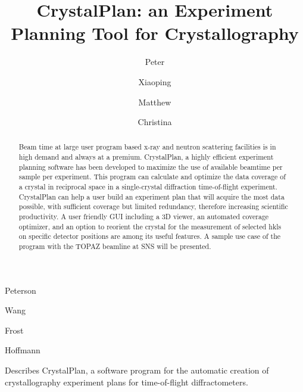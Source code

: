 \documentclass[final]{iucr}              %
\begin{document}


\title{CrystalPlan: an Experiment Planning Tool for Crystallography}



\author[]{Peter}{Peterson}
\author[]{Xiaoping}{Wang}
\author[]{Matthew}{Frost}
\author[]{Christina}{Hoffmann}







\maketitle                        %

\begin{synopsis}
Describes CrystalPlan, a software program for the automatic creation of 
crystallography experiment plans for time-of-flight diffractometers.
\end{synopsis}

\begin{abstract}
Beam time at large user program based x-ray and neutron scattering facilities is
in high demand and always at a premium. CrystalPlan, a highly efficient
experiment planning software has been developed to maximize the use of available
beamtime per sample per experiment. 
This program can calculate and optimize the data coverage of a crystal in
reciprocal space in a single-crystal diffraction time-of-flight experiment.
CrystalPlan can help a user build an experiment plan that will acquire the most
data possible, with sufficient coverage but limited redundancy, therefore
increasing scientific productivity. 
A user friendly GUI including a 3D viewer, an automated coverage optimizer,
and an option to reorient the crystal for the measurement 
of selected hkls on specific detector positions 
are among its useful features. 
A sample use case of the program with the TOPAZ beamline at SNS will be
presented. 
\end{abstract}
\end{document}
